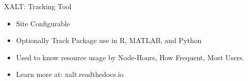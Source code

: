\documentclass{beamer}
\begin{document}
\begin{frame}{XALT: Tracking Tool}
  \begin{itemize}
    \item Site Configurable
    \item Optionally Track Package use in R, MATLAB, and Python
    \item Used to know resource usage by Node-Hours, How Frequent,
      Most Users.
    \item Learn more at: xalt.readthedocs.io
  \end{itemize}
\end{frame}

%
\end{document}
